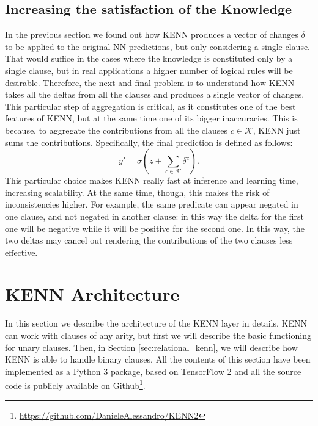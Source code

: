\subsection{Increasing the satisfaction of the Knowledge}
In the previous section we found out how KENN produces a vector of changes $\delta$ to be applied to the original NN predictions, but only considering a single clause. That would suffice in the cases where the knowledge is constituted only by a single clause, but in real applications a higher number of logical rules will be desirable. Therefore, the next and final problem is to understand how KENN takes all the deltas from all the clauses and produces a single vector of changes. This particular step of aggregation is critical, as it constitutes one of the best features of KENN, but at the same time one of its bigger inaccuracies. This is because, to aggregate the contributions from all the clauses $c \in \mathcal{K}$, KENN just sums the contributions. Specifically, the final prediction is defined as follows:
\begin{equation}
\label{eq:deltas_sum}
y'=\sigma(z + \sum_{c\in\mathcal{K}}\delta^c).
\end{equation}
This particular choice makes KENN really fast at inference and learning time, increasing scalability. At the same time, though, this makes the risk of inconsistencies higher. For example, the same predicate can appear negated in one clause, and not negated in another clause: in this way the delta for the first one will be negative while it will be positive for the second one. In this way, the two deltas may cancel out rendering the contributions of the two clauses less effective.


\section{KENN Architecture}
In this section we describe the architecture of the KENN layer in details. KENN can work with clauses of any arity, but first we will describe the basic functioning for unary clauses. Then, in Section \ref{sec:relational_kenn}, we will describe how KENN is able to handle binary clauses. All the contents of this section have been implemented as a Python 3 package, based on TensorFlow 2 \cite{abadi2016tensorflow} and all the source code is publicly available on Github\footnote{\url{https://github.com/DanieleAlessandro/KENN2}}.

